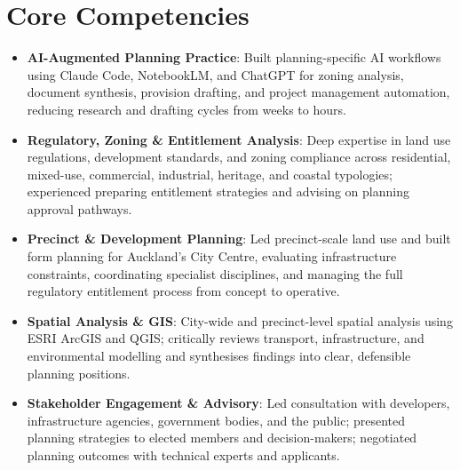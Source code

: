 \documentclass[11pt,a4paper,sans]{moderncv}
\begin{document}
\section{Core Competencies}
\vspace{1pt}
\begin{itemize}

\item \textbf{AI-Augmented Planning Practice}: Built planning-specific AI workflows using Claude Code, NotebookLM, and ChatGPT for zoning analysis, document synthesis, provision drafting, and project management automation, reducing research and drafting cycles from weeks to hours.
\vspace{1pt}

\item \textbf{Regulatory, Zoning \& Entitlement Analysis}: Deep expertise in land use regulations, development standards, and zoning compliance across residential, mixed-use, commercial, industrial, heritage, and coastal typologies; experienced preparing entitlement strategies and advising on planning approval pathways.
\vspace{1pt}

\item \textbf{Precinct \& Development Planning}: Led precinct-scale land use and built form planning for Auckland's City Centre, evaluating infrastructure constraints, coordinating specialist disciplines, and managing the full regulatory entitlement process from concept to operative.
\vspace{1pt}

\item \textbf{Spatial Analysis \& GIS}: City-wide and precinct-level spatial analysis using ESRI ArcGIS and QGIS; critically reviews transport, infrastructure, and environmental modelling and synthesises findings into clear, defensible planning positions.
\vspace{1pt}

\item \textbf{Stakeholder Engagement \& Advisory}: Led consultation with developers, infrastructure agencies, government bodies, and the public; presented planning strategies to elected members and decision-makers; negotiated planning outcomes with technical experts and applicants.

\end{itemize}

\end{document}
